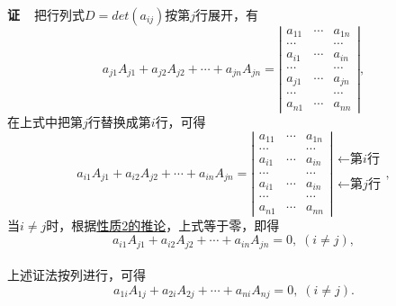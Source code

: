 \paragraph{}
\textbf{证~~}把行列式$D=det(a_{ij})$按第$j$行展开，有
\begin{equation*}
  a_{j1}A_{j1} + a_{j2}A_{j2} + \cdots + a_{jn}A_{jn} = \left|\begin{array}{ccc}
    a_{11} & \cdots & a_{1n} \\
    \cdots &  & \cdots \\
    a_{i1} & \cdots & a_{in} \\
    \cdots &  & \cdots \\
    a_{j1} & \cdots & a_{jn} \\
    \cdots &  & \cdots \\
    a_{n1} & \cdots & a_{nn}
  \end{array} \right|,
\end{equation*}
在上式中把第$j$行替换成第$i$行，可得
\begin{equation*}
  a_{i1}A_{j1} + a_{i2}A_{j2} + \cdots + a_{in}A_{jn} = \left|\begin{array}{ccc}
    a_{11} & \cdots & a_{1n} \\
    \cdots &  & \cdots \\
    a_{i1} & \cdots & a_{in} \\
    \cdots &  & \cdots \\
    a_{i1} & \cdots & a_{in} \\
    \cdots &  & \cdots \\
    a_{n1} & \cdots & a_{nn}
  \end{array} \right|\begin{array}{c}
    \\
    \\
    \text{←第$i$行} \\
    \\
    \text{←第$j$行} \\
    \\
    \\
  \end{array},
\end{equation*}
当$i\neq j$时，根据\hyperlink{行列式性质2的推论}{\color{blue}性质2的推论}，上式等于零，即得
\begin{equation*}
  a_{i1}A_{j1} + a_{i2}A_{j2} + \cdots + a_{in}A_{jn} = 0, \; (i \neq j),
\end{equation*}

\paragraph{}
上述证法按列进行，可得
\begin{equation*}
  a_{1i}A_{1j} + a_{2i}A_{2j} + \cdots + a_{ni}A_{nj} = 0, \; (i \neq j).
\end{equation*}

